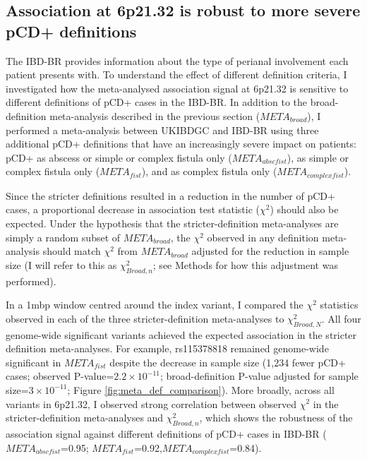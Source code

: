     \subsection{Association at 6p21.32 is robust to more severe pCD+ definitions}


The IBD-BR provides information about the type of perianal involvement each patient presents with. To understand the effect of different definition criteria, I investigated how the meta-analysed association signal at 6p21.32 is sensitive to different definitions of pCD+ cases in the IBD-BR. In addition to the broad-definition meta-analysis described in the previous section ($META_{broad}$), I performed a meta-analysis between UKIBDGC and IBD-BR using three additional pCD+ definitions that have an increasingly severe impact on patients: pCD+ as abscess or simple or complex fistula only ($META_{abscfist}$), as simple or complex fistula only ($META_{fist}$), and as complex fistula only ($META_{complexfist}$). 

Since the stricter definitions resulted in a reduction in the number of pCD+ cases, a proportional decrease in association test statistic ($\chi^{2}$) should also be expected. Under the hypothesis that the stricter-definition meta-analyses are simply a random subset of $META_{broad}$, the $\chi^{2}$  observed in any definition meta-analysis should match $\chi^{2}$ from $META_{broad}$ adjusted for the reduction in sample size (I will refer to this as $\chi^{2}_{Broad,n}$; see Methods for how this adjustment was performed). 

In a 1mbp window centred around the index variant, I compared the $\chi^{2}$ statistics observed in each of the three stricter-definition meta-analyses to $\chi^{2}_{Broad,N}$. All four genome-wide significant variants achieved the expected association in the stricter definition meta-analyses. For example, rs115378818 remained genome-wide significant in $META_{fist}$ despite the decrease in sample size (1,234 fewer pCD+ cases; observed P-value=$2.2\times10^{-11}$; broad-definition P-value adjusted for sample size=$3\times10^{-11}$; Figure \ref{fig:meta_def_comparison}). More broadly, across all variants in 6p21.32, I observed strong correlation between observed $\chi^{2}$ in the stricter-definition meta-analyses and $\chi^{2}_{Broad,n}$, which shows the robustness of the association signal against different definitions of pCD+ cases in IBD-BR ($META_{abscfist}$=0.95; $META_{fist}$=0.92,$META_{complexfist}$=0.84). 

